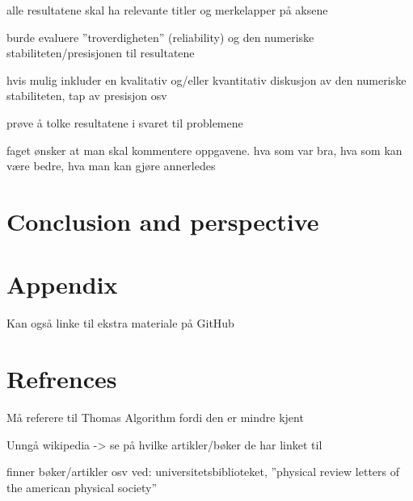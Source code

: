 \documentclass{article}
\begin{document}
  alle resultatene skal ha relevante titler og merkelapper på aksene

  burde evaluere ''troverdigheten'' (reliability) og den numeriske stabiliteten/presisjonen til resultatene

  hvis mulig inkluder en kvalitativ og/eller kvantitativ diskusjon av den numeriske stabiliteten, tap av presisjon osv

  prøve å tolke resultatene i svaret til problemene

  faget ønsker at man skal kommentere oppgavene. hva som var bra, hva som kan være bedre, hva man kan gjøre annerledes


\vspace{1cm}

\section{Conclusion and perspective}






\vspace{1cm}

\section{Appendix}

  Kan også linke til ekstra materiale på GitHub





\vspace{1cm}

\section{Refrences}

  Må referere til Thomas Algorithm fordi den er mindre kjent

  Unngå wikipedia -> se på hvilke artikler/bøker de har linket til

  finner bøker/artikler osv ved: universitetsbiblioteket, ''physical review letters of the american physical society''




\end{document}
